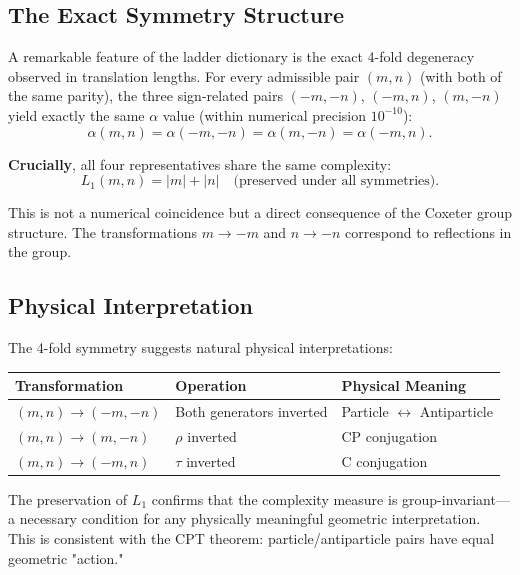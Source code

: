 \documentclass[11pt,a4paper]{article}
\begin{document}
\subsection{The Exact Symmetry Structure}

A remarkable feature of the ladder dictionary is the exact 4-fold degeneracy observed in translation lengths. For every admissible pair $(m,n)$ (with both of the same parity), the three sign-related pairs $(-m,-n)$, $(-m,n)$, $(m,-n)$ yield exactly the same $\alpha$ value (within numerical precision $10^{-10}$):
\begin{equation}
\alpha(m,n) = \alpha(-m,-n) = \alpha(m,-n) = \alpha(-m,n).
\end{equation}

\textbf{Crucially}, all four representatives share the same complexity:
\begin{equation}
L_1(m,n) = |m| + |n| \quad \text{(preserved under all symmetries)}.
\end{equation}

This is not a numerical coincidence but a direct consequence of the Coxeter group structure. The transformations $m \to -m$ and $n \to -n$ correspond to reflections in the group.

\subsection{Physical Interpretation}

The 4-fold symmetry suggests natural physical interpretations:

\begin{table}[h]
\centering
\small
\begin{tabular}{lll}
\toprule
Transformation & Operation & Physical Meaning \\
\midrule
$(m,n) \to (-m,-n)$ & Both generators inverted & Particle $\leftrightarrow$ Antiparticle \\
$(m,n) \to (m,-n)$ & $\rho$ inverted & CP conjugation \\
$(m,n) \to (-m,n)$ & $\tau$ inverted & C conjugation \\
\bottomrule
\end{tabular}
\end{table}

The preservation of $L_1$ confirms that the complexity measure is group-invariant—a necessary condition for any physically meaningful geometric interpretation. This is consistent with the CPT theorem: particle/antiparticle pairs have equal geometric "action."
\end{document}
